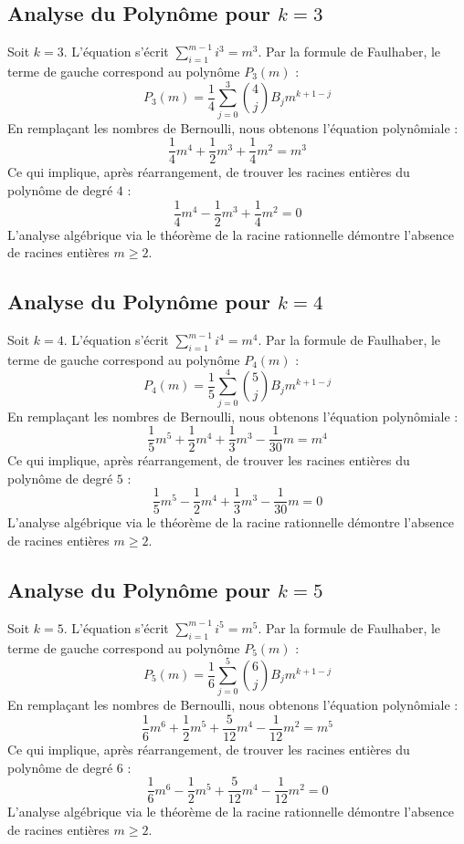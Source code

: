 \documentclass[11pt,a4paper]{article}
\begin{document}
\subsection{Analyse du Polynôme pour $k = 3$}
Soit $k = 3$. L'équation s'écrit $\sum_{i=1}^{m-1} i^{3} = m^{3}$.
Par la formule de Faulhaber, le terme de gauche correspond au polynôme $P_{3}(m)$ :
$$ P_{3}(m) = \frac{1}{4} \sum_{j=0}^{3} \binom{4}{j} B_j m^{k+1-j} $$
En remplaçant les nombres de Bernoulli, nous obtenons l'équation polynômiale :
$$ \frac{1}{4} m^4+\frac{1}{2} m^3+\frac{1}{4} m^2 = m^{3} $$
Ce qui implique, après réarrangement, de trouver les racines entières du polynôme de degré $4$ :
$$ \frac{1}{4} m^4-\frac{1}{2} m^3+\frac{1}{4} m^2 = 0 $$
L'analyse algébrique via le théorème de la racine rationnelle démontre l'absence de racines entières $m \geq 2$.

\subsection{Analyse du Polynôme pour $k = 4$}
Soit $k = 4$. L'équation s'écrit $\sum_{i=1}^{m-1} i^{4} = m^{4}$.
Par la formule de Faulhaber, le terme de gauche correspond au polynôme $P_{4}(m)$ :
$$ P_{4}(m) = \frac{1}{5} \sum_{j=0}^{4} \binom{5}{j} B_j m^{k+1-j} $$
En remplaçant les nombres de Bernoulli, nous obtenons l'équation polynômiale :
$$ \frac{1}{5} m^5+\frac{1}{2} m^4+\frac{1}{3} m^3-\frac{1}{30} m = m^{4} $$
Ce qui implique, après réarrangement, de trouver les racines entières du polynôme de degré $5$ :
$$ \frac{1}{5} m^5-\frac{1}{2} m^4+\frac{1}{3} m^3-\frac{1}{30} m = 0 $$
L'analyse algébrique via le théorème de la racine rationnelle démontre l'absence de racines entières $m \geq 2$.

\subsection{Analyse du Polynôme pour $k = 5$}
Soit $k = 5$. L'équation s'écrit $\sum_{i=1}^{m-1} i^{5} = m^{5}$.
Par la formule de Faulhaber, le terme de gauche correspond au polynôme $P_{5}(m)$ :
$$ P_{5}(m) = \frac{1}{6} \sum_{j=0}^{5} \binom{6}{j} B_j m^{k+1-j} $$
En remplaçant les nombres de Bernoulli, nous obtenons l'équation polynômiale :
$$ \frac{1}{6} m^6+\frac{1}{2} m^5+\frac{5}{12} m^4-\frac{1}{12} m^2 = m^{5} $$
Ce qui implique, après réarrangement, de trouver les racines entières du polynôme de degré $6$ :
$$ \frac{1}{6} m^6-\frac{1}{2} m^5+\frac{5}{12} m^4-\frac{1}{12} m^2 = 0 $$
L'analyse algébrique via le théorème de la racine rationnelle démontre l'absence de racines entières $m \geq 2$.
\end{document}
